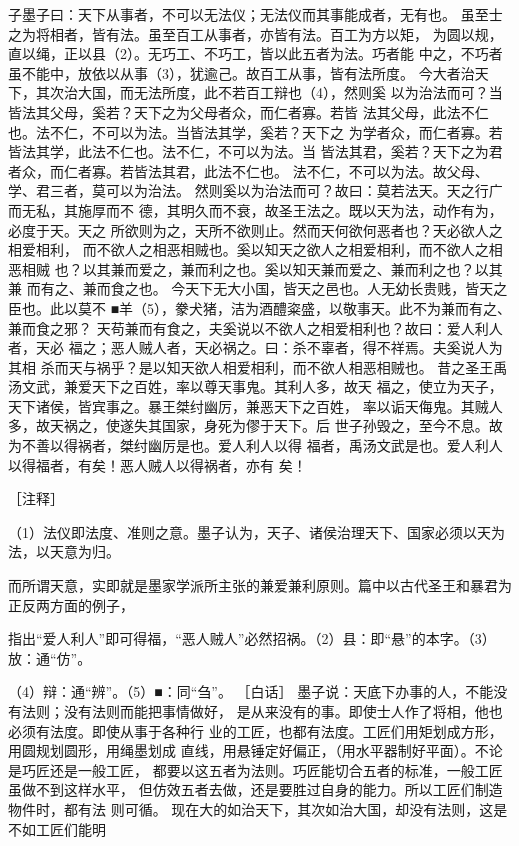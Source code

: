 \documentclass[12pt,UTF8]{ctexbook}
\begin{document}
子墨子曰：天下从事者，不可以无法仪；无法仪而其事能成者，无有也。 
虽至士之为将相者，皆有法。虽至百工从事者，亦皆有法。百工为方以矩， 
为圆以规，直以绳，正以县（2）。无巧工、不巧工，皆以此五者为法。巧者能 
中之，不巧者虽不能中，放依以从事（3），犹逾己。故百工从事，皆有法所度。 
今大者治天下，其次治大国，而无法所度，此不若百工辩也（4），然则奚 
以为治法而可？当皆法其父母，奚若？天下之为父母者众，而仁者寡。若皆 
法其父母，此法不仁也。法不仁，不可以为法。当皆法其学，奚若？天下之 
为学者众，而仁者寡。若皆法其学，此法不仁也。法不仁，不可以为法。当 
皆法其君，奚若？天下之为君者众，而仁者寡。若皆法其君，此法不仁也。 
法不仁，不可以为法。故父母、学、君三者，莫可以为治法。 
然则奚以为治法而可？故曰：莫若法天。天之行广而无私，其施厚而不 
德，其明久而不衰，故圣王法之。既以天为法，动作有为，必度于天。天之 
所欲则为之，天所不欲则止。然而天何欲何恶者也？天必欲人之相爱相利， 
而不欲人之相恶相贼也。奚以知天之欲人之相爱相利，而不欲人之相恶相贼 
也？以其兼而爱之，兼而利之也。奚以知天兼而爱之、兼而利之也？以其兼 
而有之、兼而食之也。 
今天下无大小国，皆天之邑也。人无幼长贵贱，皆天之臣也。此以莫不 
■羊（5），豢犬猪，洁为酒醴粢盛，以敬事天。此不为兼而有之、兼而食之邪？ 
天苟兼而有食之，夫奚说以不欲人之相爱相利也？故曰：爱人利人者，天必 
福之；恶人贼人者，天必祸之。曰：杀不辜者，得不祥焉。夫奚说人为其相 
杀而天与祸乎？是以知天欲人相爱相利，而不欲人相恶相贼也。 
昔之圣王禹汤文武，兼爱天下之百姓，率以尊天事鬼。其利人多，故天 
福之，使立为天子，天下诸侯，皆宾事之。暴王桀纣幽厉，兼恶天下之百姓， 
率以诟天侮鬼。其贼人多，故天祸之，使遂失其国家，身死为僇于天下。后 
世子孙毁之，至今不息。故为不善以得祸者，桀纣幽厉是也。爱人利人以得 
福者，禹汤文武是也。爱人利人以得福者，有矣！恶人贼人以得祸者，亦有 
矣！ 


［注释］ 

（1）法仪即法度、准则之意。墨子认为，天子、诸侯治理天下、国家必须以天为法，以天意为归。 

而所谓天意，实即就是墨家学派所主张的兼爱兼利原则。篇中以古代圣王和暴君为正反两方面的例子， 

指出“爱人利人”即可得福，“恶人贼人”必然招祸。（2）县：即“悬”的本字。（3）放：通“仿”。 

（4）辩：通“辨”。（5）■：同“刍”。 
［白话］ 
墨子说：天底下办事的人，不能没有法则；没有法则而能把事情做好， 
是从来没有的事。即使士人作了将相，他也必须有法度。即使从事于各种行 
业的工匠，也都有法度。工匠们用矩划成方形，用圆规划圆形，用绳墨划成 
直线，用悬锤定好偏正，（用水平器制好平面）。不论是巧匠还是一般工匠， 
都要以这五者为法则。巧匠能切合五者的标准，一般工匠虽做不到这样水平， 
但仿效五者去做，还是要胜过自身的能力。所以工匠们制造物件时，都有法 
则可循。 
现在大的如治天下，其次如治大国，却没有法则，这是不如工匠们能明 
\end{document}
